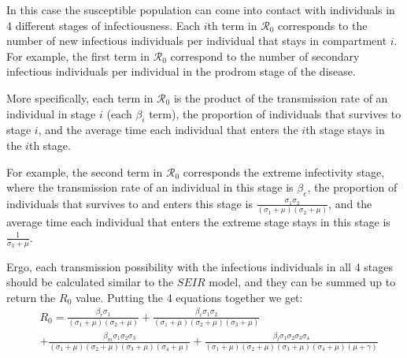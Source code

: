 In this case the susceptible population can come into contact with individuals in 4 different stages of infectiousness. Each $i$th term in $\mathcal R_0$ corresponds to the number of new infectious individuals per individual that stays in compartment $i$. For example, the first term in $\mathcal R_0$ correspond to the number of secondary infectious individuals per individual in the prodrom stage of the disease.\par
More specifically, each term in $\mathcal R_0$ is the product of the transmission rate of an individual in stage $i$ (each $\beta_i$ term), the proportion of individuals that survives to stage $i$, and the average time each individual that enters the $i$th stage stays in the $i$th stage.\par
For example, the second term in $\mathcal R_0$ corresponds the extreme infectivity stage, where the transmission rate of an individual in this stage is $\beta_e$, the proportion of individuals that survives to and enters this stage is $\frac{\sigma_1 \sigma_2}{(\sigma_1 + \mu)(\sigma_2 + \mu)}$, and the average time each individual that enters the extreme stage stays in this stage is $\frac{1}{\sigma_3 + \mu}$. \par
Ergo, each transmission possibility with the infectious individuals in all 4 stages should be calculated similar to the $SEIR$ model, and they can be summed up to return the $R_0$ value. Putting the 4 equations together we get:
\begin{align*}
&R_0 = \frac{\beta_r \sigma_{1}}{{\left(\sigma_{1} + \mu\right)} {\left(\sigma_{2} + \mu\right)}} + \frac{\beta_e \sigma_{1} \sigma_{2}}{{\left(\sigma_{1} + \mu\right)} {\left(\sigma_{2} + \mu\right)} {\left(\sigma_{3} + \mu\right)}}\\ 
&+ \frac{\beta_m \sigma_{1} \sigma_{2} \sigma_{3}}{{\left(\sigma_{1} + \mu\right)} {\left(\sigma_{2} + \mu\right)} {\left(\sigma_{3} + \mu\right)} {\left(\sigma_{4} + \mu\right)}} + \frac{\beta_l \sigma_{1} \sigma_{2} \sigma_{3} \sigma_{4}}{{\left(\sigma_{1} + \mu\right)} {\left(\sigma_{2} + \mu\right)} {\left(\sigma_{3} + \mu\right)} {\left(\sigma_{4} + \mu\right)} {\left(\mu + \gamma\right)}}
\end{align*}
